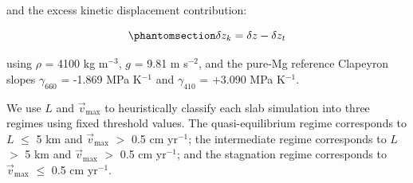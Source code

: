 \documentclass[draft,linenumbers]{agujournal2019}
\begin{document}
and the excess kinetic displacement contribution:

\begin{equation}\protect\phantomsection\label{eq:kinetic-displacement}{\delta z_k = \delta z - \delta z_t}\end{equation}

using \(\rho\) = 4100 kg m\(^{-3}\), \(g\) = 9.81 m s\(^{-2}\), and the
pure-Mg reference Clapeyron slopes \(\gamma_{660}\) = -1.869 MPa
K\(^{-1}\) and \(\gamma_{410}\) = +3.090 MPa K\(^{-1}\).

We use \(L\) and \(\vec{v}_\mathrm{max}\) to heuristically classify each
slab simulation into three regimes using fixed threshold values. The
quasi-equilibrium regime corresponds to \(L\) \(\leq\) 5 km and
\(\vec{v}_\mathrm{max}\) \(>\) 0.5 cm yr\(^{-1}\); the intermediate
regime corresponds to \(L\) \(>\) 5 km and \(\vec{v}_\mathrm{max}\)
\(>\) 0.5 cm yr\(^{-1}\); and the stagnation regime corresponds to
\(\vec{v}_\mathrm{max}\) \(\leq\) 0.5 cm yr\(^{-1}\).
\end{document}
